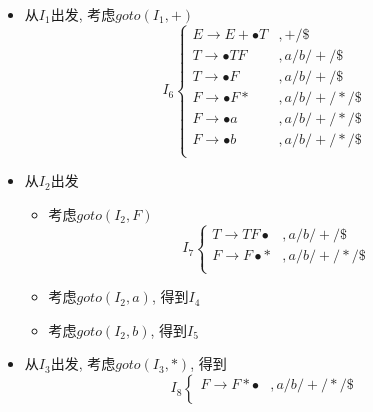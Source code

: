 \documentclass[UTF8]{article}
\newcommand{\blt}{\bullet}
\begin{document}
\begin{itemize}
\begin{itemize}
\begin{itemize}
$$\begin{array}{ll}
			\end{array}\right.$$
		\item 考虑$goto(I_0,F)$
			$$I_3\left\{\begin{array}{ll}
			T\rightarrow F\blt & , a/b/+/\$\\
			F\rightarrow F\blt * & , a/b/+/*/\$\\
			\end{array}\right.$$
		\item 考虑$goto(I_0,a)$
			$$I_4\left\{\begin{array}{ll}
			F\rightarrow a\blt & ,a/b/+/*/\$\\
			\end{array}\right.$$
		\item 考虑$goto(I_0,a)$
			$$I_5\left\{\begin{array}{ll}
			F\rightarrow b\blt & ,a/b/+/*/\$\\
			\end{array}\right.$$
		\end{itemize}
	\item 从$I_1$出发, 考虑$goto(I_1,+)$
		$$I_6\left\{\begin{array}{ll}
		E\rightarrow  E+\blt T & ,+/\$\\
		T\rightarrow\blt TF & ,a/b/+/\$\\
		T\rightarrow\blt F & , a/b/+/\$\\
		F\rightarrow\blt F* & , a/b/+/*/\$\\
		F\rightarrow\blt a & ,a/b/+/*/\$\\
		F\rightarrow\blt b & ,a/b/+/*/\$\\
		\end{array}\right.$$
	\item 从$I_2$出发
		\begin{itemize}
		\item 考虑$goto(I_2,F)$
			$$I_7\left\{\begin{array}{ll}
			T\rightarrow TF\blt & ,a/b/+/\$\\
			F\rightarrow F\blt * & , a/b/+/*/\$\\
			\end{array}\right.$$
		\item 考虑$goto(I_2,a)$, 得到$I_4$
		\item 考虑$goto(I_2,b)$, 得到$I_5$
		\end{itemize}
	\item 从$I_3$出发, 考虑$goto(I_3,*)$, 得到
		$$I_8\left\{\begin{array}{ll}
		F\rightarrow F*\blt & , a/b/+/*/\$\\

\end{array}$$
\end{itemize}
\end{itemize}
\end{document}
